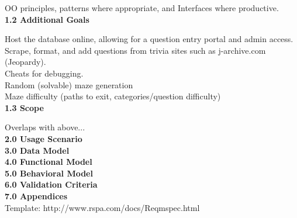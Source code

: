 \documentclass[12pt]{article}
\begin{document}
OO principles, patterns where appropriate, and
Interfaces where productive.\\

\textbf{\Large 1.2 Additional Goals}

Host the database online, allowing for a question entry portal and admin access.\\

Scrape, format, and add questions from trivia sites such as j-archive.com (Jeopardy).\\

Cheats for debugging.\\

Random (solvable) maze generation\\

Maze difficulty (paths to exit, categories/question difficulty)\\

\textbf{\Large 1.3 Scope}

Overlaps with above...\\


\noindent
\textbf{\Large 2.0 Usage Scenario}\\

\noindent
\textbf{\Large 3.0 Data Model}\\

\noindent
\textbf{\Large 4.0 Functional Model}\\

\noindent
\textbf{\Large 5.0 Behavioral Model}\\

\noindent
\textbf{\Large 6.0 Validation Criteria}\\

\noindent
\textbf{\Large 7.0 Appendices}\\
Template: http://www.rspa.com/docs/Reqmspec.html
\end{document}
